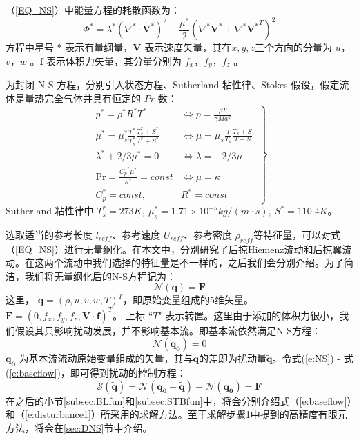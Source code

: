 （\ref{EQ_NS}）中能量方程的耗散函数为：
\begin{equation}
    {\Phi ^*} = {\lambda ^*}{{\left( {{\nabla ^*} \cdot {{{\mathbf{V}}}^*}} \right)}^2} + \frac{{{\mu ^*}}}{2}{{\left( {{\nabla ^*}{{{\mathbf{V}}}^*} + {\nabla ^*}{{{\mathbf{V}}}^*}^T} \right)}^2}
\end{equation}
方程中星号 $*$ 表示有量纲量，${\mathbf{V}}$ 表示速度矢量，其在$x,y,z$三个方向的分量为 $u$，$v$，$w$ 。${\mathbf{f}}$ 表示体积力矢量，其分量分别为 $f_x$，$f_y$，$f_z$ 。

为封闭 N-S 方程，分别引入状态方程、Sutherland 粘性律、Stokes 假设，假定流体是量热完全气体并具有恒定的 $Pr$ 数：
\begin{equation}\left.
\begin{aligned}
p^*=\rho^*R^*T^* & \Leftrightarrow p=\frac{\rho T}{\gamma Ma^2} \\
\mu^*=\mu_s^*\frac{T^*}{T^*_s}\frac{T^*_s+S^*}{T^*+S^*} & \Leftrightarrow \mu=\mu_s\frac{T}{T_s}\frac{T_s+S}{T+S} \\
\lambda^*+2/3\mu^*=0 & \Leftrightarrow\lambda=-2/3\mu\\
\textrm{Pr}=\frac{{C_p}^*\mu^*}{\kappa^*}={const} & \Leftrightarrow\mu=\kappa\\
C_p^*=const,~ & R^*=const
\end{aligned}~\right\}
\end{equation}
Sutherland 粘性律中 $T^*_s=273K,~\mu_s^*=1.71\times10^{-5}kg/(m\cdot s),~S^*=110.4K$。

选取适当的参考长度 $l_{reff}$、参考速度 $U_{reff}$、参考密度 $\rho_{reff}$等特征量，可以对式（\ref{EQ_NS}）进行无量纲化。在本文中，分别研究了后掠Hiemenz流动和后掠翼流动。在这两个流动中我们选择的特征量是不一样的，之后我们会分别介绍。为了简洁，我们将无量纲化后的N-S方程记为：
\begin{equation}
    \label{e:NS}
    \mathscr{N}(\mathbf{q})=\mathbf{F}
\end{equation}
这里， $\mathbf{q}=(\rho , u,v,w,T)^T$，即原始变量组成的5维矢量。$\mathbf{F}=(0,f_x,f_y,f_z,\mathbf{V} \cdot \mathbf{f})^T$。 上标 ``$T$" 表示转置。这里由于添加的体积力很小，我们假设其只影响扰动发展，并不影响基本流。即基本流依然满足N-S方程：
\begin{equation}
    \label{e:baseflow}
    \mathscr{N}(\mathbf{q_0})=0
\end{equation}
$\mathbf{q_0}$ 为基本流流动原始变量组成的矢量，其与$\mathbf{q}$的差即为扰动量$\mathbf{\tilde{q}}$。令式(\ref{e:NS}) - 式(\ref{e:baseflow})，即可得到扰动的控制方程：
\begin{equation}
    \label{e:disturbance1}
    \mathscr{S}(\mathbf{\tilde{q}})=\mathscr{N}(\mathbf{q_0}+\mathbf{\tilde{q}})-\mathscr{N}(\mathbf{q_0})=\mathbf{F}
\end{equation}
在之后的小节\ref{subsec:BLfun}和\ref{subsec:STBfun}中，将会分别介绍式（\ref{e:baseflow}）和（\ref{e:disturbance1}）所采用的求解方法。至于求解步骤1中提到的高精度有限元方法，将会在\ref{sec:DNS}节中介绍。
